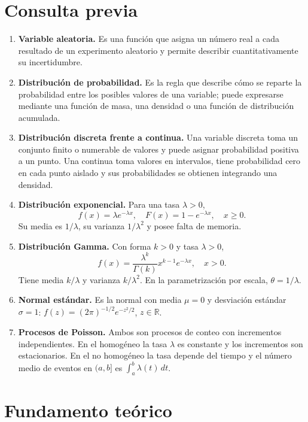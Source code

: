 \documentclass[11pt,a4paper]{article}
\begin{document}
\section{Consulta previa}
\begin{enumerate}[label=\arabic*.]
 \item \textbf{Variable aleatoria.} Es una función que asigna un número real a cada
 resultado de un experimento aleatorio y permite describir cuantitativamente su incertidumbre.
 \item \textbf{Distribución de probabilidad.} Es la regla que describe cómo se reparte
 la probabilidad entre los posibles valores de una variable; puede expresarse mediante
 una función de masa, una densidad o una función de distribución acumulada.
 \item \textbf{Distribución discreta frente a continua.} Una variable discreta toma un
 conjunto finito o numerable de valores y puede asignar probabilidad positiva a un punto.
 Una continua toma valores en intervalos, tiene probabilidad cero en cada punto aislado y
 sus probabilidades se obtienen integrando una densidad.
 \item \textbf{Distribución exponencial.} Para una tasa $\lambda>0$,
 \begin{equation}f(x)=\lambda e^{-\lambda x},\quad F(x)=1-e^{-\lambda x},\quad x\geq0.\end{equation}
 Su media es $1/\lambda$, su varianza $1/\lambda^2$ y posee falta de memoria.
 \item \textbf{Distribución Gamma.} Con forma $k>0$ y tasa $\lambda>0$,
 \begin{equation}f(x)=\frac{\lambda^k}{\Gamma(k)}x^{k-1}e^{-\lambda x},\quad x>0.\end{equation}
 Tiene media $k/\lambda$ y varianza $k/\lambda^2$. En la parametrización por escala,
 $\theta=1/\lambda$.
 \item \textbf{Normal estándar.} Es la normal con media $\mu=0$ y desviación estándar
 $\sigma=1$: $f(z)=(2\pi)^{-1/2}e^{-z^2/2}$, $z\in\mathbb{R}$.
 \item \textbf{Procesos de Poisson.} Ambos son procesos de conteo con incrementos
 independientes. En el homogéneo la tasa $\lambda$ es constante y los incrementos son
 estacionarios. En el no homogéneo la tasa depende del tiempo y el número medio de eventos
 en $(a,b]$ es $\int_a^b\lambda(t)\,dt$.
\end{enumerate}

\section{Fundamento teórico}
\end{document}

